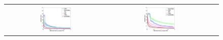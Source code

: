 \documentclass[]{article}
\newcommand{\nnn}{0.33}
\newcommand{\nnh}{0.23}
\begin{document}
\begin{figure}[t!]
\vspace{-0mm}
\begin{center}
\begin{tabular}{ccc}
   \hspace{-5mm} \includegraphics[width=\nnn\textwidth, height=\nnh\textwidth]{plotsx/collisionx/err-vs-time__param5-shaded.pdf} 
& \hspace{-3mm} \includegraphics[width=\nnn\textwidth, height=\nnh\textwidth]{plotsx/collisionx/err-vs-time__param15-shaded.pdf} 

\end{tabular}
\end{center}
\end{figure}
\end{document}
